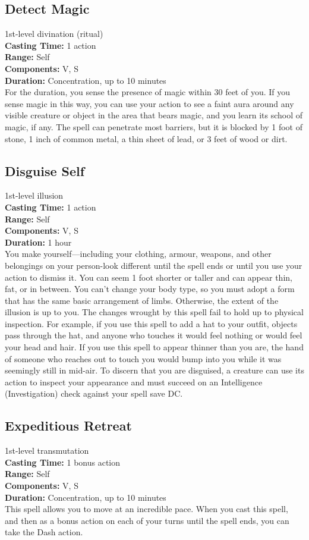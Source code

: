 \documentclass[11pt, A4paper, english]{article}
\begin{document}
		\subsection{Detect Magic}
1st-level divination (ritual) \\
\textbf{Casting Time:} 1 action \\
\textbf{Range:} Self \\
\textbf{Components:} V, S \\
\textbf{Duration:} Concentration, up to 10 minutes \\
For the duration, you sense the presence of magic within 30 feet of you. If you sense magic in this way, you can use your action to see a faint aura around any visible creature or object in the area that bears magic, and you learn its school of magic, if any. The spell can penetrate most barriers, but it is blocked by 1  foot of stone, 1 inch of common metal, a thin sheet of lead, or 3 feet of wood or dirt.

		\subsection{Disguise Self}
1st-level illusion \\
\textbf{Casting Time:} 1 action \\
\textbf{Range:} Self \\
\textbf{Components:} V, S \\
\textbf{Duration:} 1 hour \\
You make yourself—including your clothing, armour, weapons, and other belongings on your person-look different until the spell ends or until you use your action to dismiss it. You can seem 1  foot shorter or taller and can appear thin, fat, or in between. You can’t change your body type, so you must adopt a form that has the same basic arrangement of limbs. Otherwise, the extent of the illusion is up to you. The changes wrought by this spell fail to hold up to physical inspection. For example, if you use this spell to add a hat to your outfit, objects pass through the hat, and anyone who touches it would feel nothing or would feel your head and hair. If you use this spell to appear thinner than you are, the hand of someone who reaches out to touch you would bump into you while it was seemingly still in mid-air. To discern that you are disguised, a creature can use its action to inspect your appearance and must succeed on an Intelligence (Investigation) check against your spell save DC.

		\subsection{Expeditious Retreat}
1st-level transmutation \\
\textbf{Casting Time:} 1 bonus action \\
\textbf{Range:} Self \\
\textbf{Components:} V, S \\
\textbf{Duration:} Concentration, up to 10 minutes \\
This spell allows you to move at an incredible pace. When you cast this spell, and then as a bonus action on each of your turns until the spell ends, you can take the Dash action.
\end{document}
